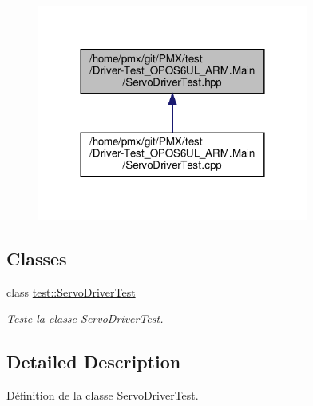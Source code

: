 \begin{figure}[H]
\begin{center}
\leavevmode
\includegraphics[width=252pt]{Driver-Test__OPOS6UL__ARM_8Main_2ServoDriverTest_8hpp__dep__incl}
\end{center}
\end{figure}
\subsection*{Classes}
\begin{DoxyCompactItemize}
\item 
class \hyperlink{classtest_1_1ServoDriverTest}{test\+::\+Servo\+Driver\+Test}
\begin{DoxyCompactList}\small\item\em Teste la classe \hyperlink{classtest_1_1ServoDriverTest}{Servo\+Driver\+Test}. \end{DoxyCompactList}\end{DoxyCompactItemize}


\subsection{Detailed Description}
Définition de la classe Servo\+Driver\+Test. 

